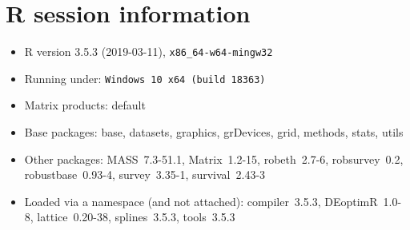\documentclass[a4paper]{scrartcl}
\begin{document}
\section{R session information}
\begin{itemize}\raggedright
  \item R version 3.5.3 (2019-03-11), \verb|x86_64-w64-mingw32|
  \item Running under: \verb|Windows 10 x64 (build 18363)|
  \item Matrix products: default
  \item Base packages: base, datasets, graphics, grDevices, grid,
    methods, stats, utils
  \item Other packages: MASS~7.3-51.1, Matrix~1.2-15, robeth~2.7-6,
    robsurvey~0.2, robustbase~0.93-4, survey~3.35-1, survival~2.43-3
  \item Loaded via a namespace (and not attached): compiler~3.5.3,
    DEoptimR~1.0-8, lattice~0.20-38, splines~3.5.3, tools~3.5.3
\end{itemize}
\end{document}
